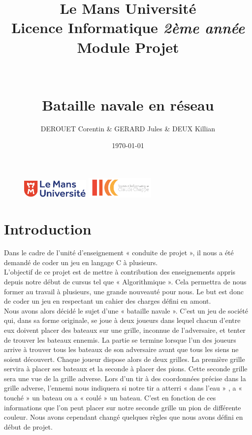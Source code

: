 \documentclass[a4paper,12pt]{article}
\begin{document}
\begin {figure}
\includegraphics[width=0.3\textwidth]{logolemansU.png}
\hspace{150pt} 
\includegraphics[width=0.3\textwidth] {logo_ic2.png}
\end {figure}
\title {\textbf {\color {blue} Le Mans Université}\color{black}
\\  Licence Informatique  \textit {2ème année}
 \\Module Projet
 \\\\\\ \textbf {Bataille navale en réseau}}
\author{DEROUET Corentin & GERARD Jules & DEUX Killian}

\date{\today} 
\maketitle \newpage
\newpage
\tableofcontents
\newpage


 
\section {Introduction}
 	Dans le cadre de l'unité d'enseignement « conduite de projet », il nous a été demandé de coder un jeu en langage C à plusieurs. \vspace{1\baselineskip}\\
    L'objectif de ce projet est de mettre à contribution des enseignements appris depuis notre début de cursus tel que « Algorithmique ». Cela permettra de nous former au travail à plusieurs, une grande nouveauté pour nous. Le but est donc de coder un jeu en respectant un cahier des charges défini en amont.\\
    Nous avons alors décidé le sujet d’une « bataille navale ». C'est un jeu de société qui, dans sa forme originale, se joue à deux joueurs dans lequel chacun d'entre eux doivent placer des bateaux sur une grille, inconnue de l'adversaire, et tenter de trouver les bateaux ennemis. La partie se termine lorsque l'un des joueurs arrive à trouver tous les bateaux de son adversaire avant que tous les siens ne soient découvert. Chaque joueur dispose alors de deux grilles. La première grille servira à placer ses bateaux et la seconde à placer des pions. Cette seconde grille sera une vue de la grille adverse. Lors d'un tir à des coordonnées précise dans la grille adverse, l'ennemi nous indiquera si notre tir a atterri « dans l'eau » , a « touché » un bateau ou a « coulé » un bateau. C'est en fonction de ces informations que l'on peut placer sur notre seconde grille un pion de différente couleur. Nous avons cependant changé quelques règles que nous avons défini en début de projet. \\
 
\end{document}
